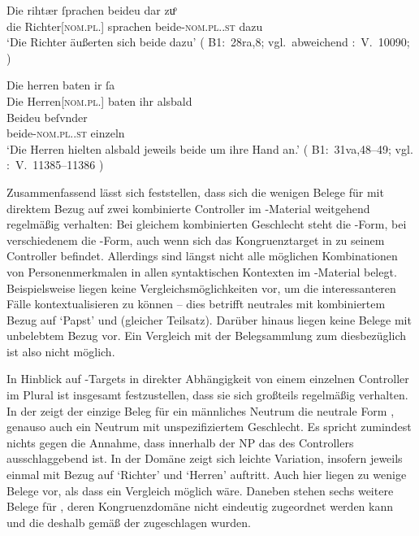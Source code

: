 \begin{exe}
\ex \label{ex:richtherriu2}
	\begin{xlist}
	\ex \label{ex:richtherriu2_1}
		\gll Die rihtær ſprachen beideu {dar zuͦ} \\
			die Richter[\textsc{nom.pl.\MascM}] sprachen beide-\textsc{nom.pl.\NeutM.st}
			dazu \\
		\trans `Die Richter äußerten sich beide dazu'
			(%
				B1:~28ra,8; vgl.~abweichend
				\KC:~V.~10090;
				\cite[267]{schroeder1895}%
			)

	\ex \label{ex:richtherriu2_2}
		\gll Die herren baten ir ſa \\
			Die Herren[\textsc{nom.pl.\MascM}] baten ihr alsbald \\
	\sn \gll Beideu beſvnder \\
			beide-\textsc{nom.pl.\NeutM.st} einzeln \\
		\trans `Die Herren hielten alsbald jeweils beide um ihre Hand an.'
			(%
				B1:~31va,48--49; vgl.
				\KC:~V.~11385--11386
				\cite[289]{schroeder1895}%
			)
	\end{xlist}
\end{exe}

Zusammenfassend lässt sich feststellen, dass sich die wenigen Belege für
 mit direktem Bezug auf zwei kombinierte Controller im
\KC{}-Material weitgehend regelmäßig verhalten: Bei gleichem
kombinierten Geschlecht steht die -Form, bei verschiedenem die
-Form, auch wenn sich das Kongruenztarget in  zu
seinem Controller befindet. Allerdings sind längst nicht alle möglichen
Kombinationen von Personenmerkmalen in allen syntaktischen Kontexten im
\KC{}-Material belegt. Beispielsweise liegen keine
Vergleichs\-möglich\-keiten vor, um die interessanteren Fälle kontextualisieren
zu können -- dies betrifft neutrales  mit kombiniertem Bezug auf
 `Papst' und  (gleicher Teilsatz). Darüber
hinaus liegen keine Belege mit unbelebtem Bezug vor. Ein
Vergleich mit der Belegsammlung zum \CAO{} diesbezüglich ist also nicht
möglich.

In Hinblick auf -Targets in direkter Abhängigkeit von einem
einzelnen Controller im Plural ist insgesamt festzustellen, dass sie sich
großteils regelmäßig verhalten. In der  
zeigt der einzige Beleg für ein männliches Neutrum die neutrale Form
, genauso auch ein Neutrum mit unspezifiziertem Geschlecht. Es
spricht zumindest nichts gegen die Annahme, dass innerhalb der
NP das  des Controllers ausschlaggebend ist. In
der Domäne  zeigt sich leichte Variation, insofern jeweils
einmal  mit Bezug auf  `Richter' und 
`Herren' auftritt. Auch hier liegen zu wenige Belege vor, als dass ein
Vergleich möglich wäre. Daneben stehen sechs weitere Belege für ,
deren Kongruenzdomäne nicht eindeutig zugeordnet
werden kann und die deshalb gemäß \citet[623]{ksw2} der 
 zugeschlagen wurden.

